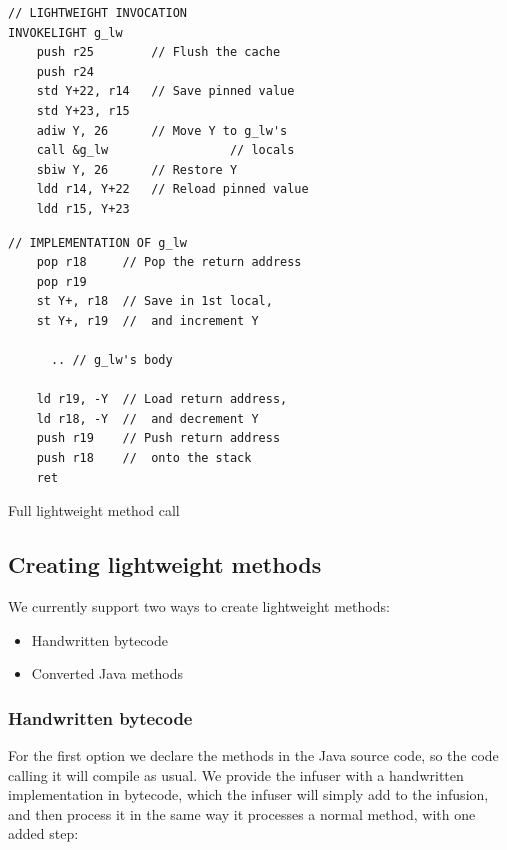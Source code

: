 \begin{listing}
\centering
\begin{minipage}[t]{0.48\textwidth}
\begin{verbatim}
// LIGHTWEIGHT INVOCATION
INVOKELIGHT g_lw
    push r25        // Flush the cache
    push r24
    std Y+22, r14   // Save pinned value
    std Y+23, r15
    adiw Y, 26      // Move Y to g_lw's
    call &g_lw                 // locals
    sbiw Y, 26      // Restore Y
    ldd r14, Y+22   // Reload pinned value
    ldd r15, Y+23
\end{verbatim}
\end{minipage}\hfill
\begin{minipage}[t]{0.48\textwidth}
\centering
\begin{verbatim}
// IMPLEMENTATION OF g_lw
    pop r18     // Pop the return address
    pop r19
    st Y+, r18  // Save in 1st local,
    st Y+, r19  //  and increment Y

      .. // g_lw's body

    ld r19, -Y  // Load return address,
    ld r18, -Y  //  and decrement Y
    push r19    // Push return address
    push r18    //  onto the stack
    ret
\end{verbatim}
\end{minipage}
\caption{Full lightweight method call}
\label{lst-full-lighweight-method-call}
\end{listing}


\subsection{Creating lightweight methods}
We currently support two ways to create lightweight methods:
\begin{itemize}
	\item Handwritten bytecode
	\item Converted Java methods
\end{itemize}

\subsubsection{Handwritten bytecode}
For the first option we declare the methods  in the Java source code, so the code calling it will compile as usual. We provide the infuser with a handwritten implementation in bytecode, which the infuser will simply add to the infusion, and then process it in the same way it processes a normal method, with one added step:

